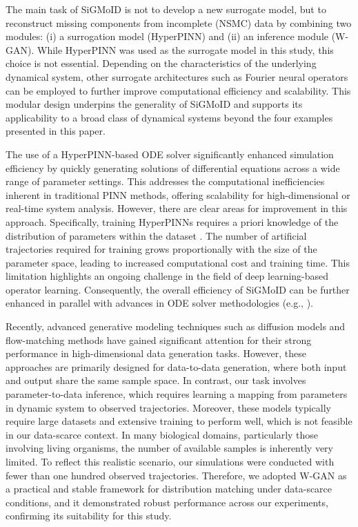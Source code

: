 \documentclass[letterpaper]{article} %
\theoremstyle{thmstyleone}%
\theoremstyle{thmstyletwo}%
\theoremstyle{thmstylethree}%
\begin{document}
The main task of SiGMoID is not to develop a new surrogate model, but to reconstruct missing components from incomplete (NSMC) data by combining two modules: (i) a surrogation model (HyperPINN) and (ii) an inference module (W-GAN). While HyperPINN was used as the surrogate model in this study, this choice is not essential. Depending on the characteristics of the underlying dynamical system, other surrogate architectures such as Fourier neural operators \cite{li2020fourier} can be employed to further improve computational efficiency and scalability. This modular design underpins the generality of SiGMoID and supports its applicability to a broad class of dynamical systems beyond the four examples presented in this paper.

The use of a HyperPINN-based ODE solver significantly enhanced simulation efficiency by quickly generating solutions of differential equations across a wide range of parameter settings. This addresses the computational inefficiencies inherent in traditional PINN methods, offering scalability for high-dimensional or real-time system analysis. However, there are clear areas for improvement in this approach. Specifically, training HyperPINNs requires a priori knowledge of the distribution of parameters within the dataset \cite{de2021hyperpinn}. The number of artificial trajectories required for training grows proportionally with the size of the parameter space, leading to increased computational cost and training time. This limitation highlights an ongoing challenge in the field of deep learning-based operator learning. Consequently, the overall efficiency of SiGMoID can be further enhanced in parallel with advances in ODE solver methodologies (e.g., \cite{lee2025finite}).

Recently, advanced generative modeling techniques such as diffusion models and flow-matching methods \cite{ho2020denoising, lipman2022flow} have gained significant attention for their strong performance in high-dimensional data generation tasks. However, these approaches are primarily designed for data-to-data generation, where both input and output share the same sample space. In contrast, our task involves parameter-to-data inference, which requires learning a mapping from parameters in dynamic system to observed trajectories. Moreover, these models typically require large datasets and extensive training to perform well, which is not feasible in our data-scarce context. In many biological domains, particularly those involving living organisms, the number of available samples is inherently very limited. To reflect this realistic scenario, our simulations were conducted with fewer than one hundred observed trajectories. Therefore, we adopted W-GAN as a practical and stable framework for distribution matching under data-scarce conditions, and it demonstrated robust performance across our experiments, confirming its suitability for this study.
\end{document}
